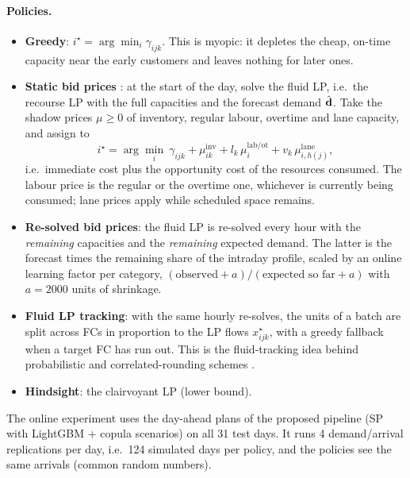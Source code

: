 \paragraph{Policies.}
\begin{itemize}
  \item \textbf{Greedy}: $i^\star=\arg\min_i\gamma_{ijk}$. This is myopic: it depletes the cheap, on-time capacity near the early customers and leaves nothing for later ones.
  \item \textbf{Static bid prices} \citep{acimovic2015,talluri1998}: at the start of the day, solve the fluid LP, i.e.\ the recourse LP with the full capacities and the forecast demand $\hat{\mathbf{d}}$. Take the shadow prices $\mu\ge0$ of inventory, regular labour, overtime and lane capacity, and assign to
  \[ i^\star = \arg\min_i\ \gamma_{ijk} + \mu^{\mathrm{inv}}_{ik} + l_k\,\mu^{\mathrm{lab/ot}}_{i} + v_k\,\mu^{\mathrm{lane}}_{i,h(j)}, \]
  i.e.\ immediate cost plus the opportunity cost of the resources consumed. The labour price is the regular or the overtime one, whichever is currently being consumed; lane prices apply while scheduled space remains.
  \item \textbf{Re-solved bid prices}: the fluid LP is re-solved every hour with the \emph{remaining} capacities and the \emph{remaining} expected demand. The latter is the forecast times the remaining share of the intraday profile, scaled by an online learning factor per category, $(\text{observed} + a)/(\text{expected so far} + a)$ with $a=2000$ units of shrinkage.
  \item \textbf{Fluid LP tracking}: with the same hourly re-solves, the units of a batch are split across FCs in proportion to the LP flows $x^\star_{ijk}$, with a greedy fallback when a target FC has run out. This is the fluid-tracking idea behind probabilistic and correlated-rounding schemes \citep{jasin2015}.
  \item \textbf{Hindsight}: the clairvoyant LP (lower bound).
\end{itemize}
The online experiment uses the day-ahead plans of the proposed pipeline (SP with LightGBM + copula scenarios) on all 31 test days.
It runs 4 demand/arrival replications per day, i.e.\ 124 simulated days per policy, and the policies see the same arrivals (common random numbers).


